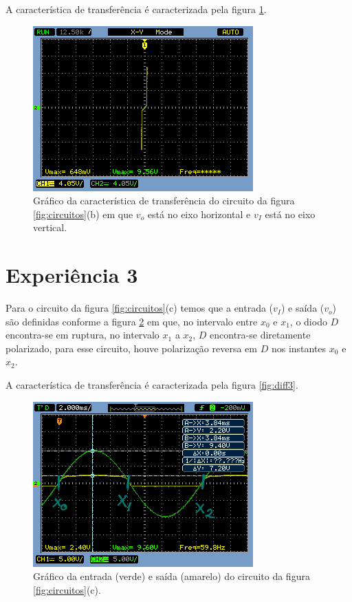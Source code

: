 \documentclass{abntex2}
\begin{document}
A característica de transferência é caracterizada pela figura \ref{fig:diff2}.

\begin{figure}[h]
  \centering
  \includegraphics[scale = 0.7]{diferenca-1b.png}
  \caption{Gráfico da característica de transferência do circuito da figura \ref{fig:circuitos}(b) em que $v_o$ está no eixo horizontal e $v_I$ está no eixo vertical.}
  \label{fig:diff2}
\end{figure}
\pagebreak
\section{Experiência 3}

Para o circuito da figura \ref{fig:circuitos}(c) temos que a entrada ($v_I$) e saída ($v_o$) são definidas conforme a figura \ref{fig:io3}  em que, no intervalo entre $x_0$ e $x_1$, o diodo $D$ encontra-se em ruptura, no intervalo $x_1$ a $x_2$, $D$ encontra-se diretamente polarizado, para esse circuito, houve polarização reversa em $D$ nos instantes $x_0$ e $x_2$.

A característica de transferência é caracterizada pela figura \ref{fig:diff3}.

\begin{figure}[h]
  \centering
  \includegraphics[scale = 0.7]{circuito-1c-esboco2.png}
  \caption{Gráfico da entrada (verde) e saída (amarelo) do circuito da figura \ref{fig:circuitos}(c).}
  \label{fig:io3}
\end{figure}
\end{document}
